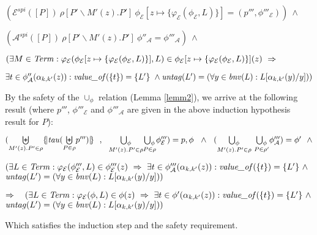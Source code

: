 \documentclass[10pt,a4paper,final,oneside,fleqn]{book}
\begin{document}
\noindent
$(\mathcal{E}^{spi}(\![P]\!)~\rho[P'\backslash M'(z).P']~\phi_\mathcal{E}[z\mapsto\{\varphi_\mathcal{E}(\phi_\mathcal{E},L)\}]=(p''',\phi'''_\mathcal{E}))~\wedge$

\noindent
$(\mathcal{A}^{spi}(\![P]\!)~\rho[P'\backslash M'(z).P']~\phi''_\mathcal{A}=\phi'''_\mathcal{A})~\wedge$

\noindent
$(\exists M\in\mbox{{\itshape Term\/}}:\varphi_\mathcal{E}(\phi_\mathcal{E}[z\mapsto\{\varphi_\mathcal{E}(\phi_\mathcal{E},L)\}],L)\in\phi_\mathcal{E}[z\mapsto\{\varphi_\mathcal{E}(\phi_\mathcal{E},L)\}](z)~\Rightarrow$

\noindent
$\exists t\in\phi''_\mathcal{A}(\alpha_{k,k'}(z)):\mbox{{\itshape value\_of\/}}(\{t\})=\{L'\}~\wedge\mbox{{\itshape untag\/}}(L')=(\forall y\in\mbox{{\itshape bnv\/}}(L):L[\alpha_{k,k'}(y)/y]))$\vspace{4mm}

\noindent
By the safety of the $\cup_\phi$ relation (Lemma \ref{lemm2}), we arrive at the following result (where $p'''$, $\phi'''_\mathcal{E}$ and $\phi'''_\mathcal{A}$ are given in the above induction hypothesis result for $P$):

\noindent
$(\underset{M'(z).P'\in\rho}{\biguplus}\{\!|\mbox{{\itshape tau\/}}(\underset{P\in\rho}{\biguplus}p''')|\!\}~~,~~\underset{M'(z).P'\in\rho}{\bigcup_\phi}\underset{P\in\rho}{\bigcup_\phi}\phi'''_\mathcal{E})=p,\phi~~\wedge~~(\underset{M'(z).P'\in\rho}{\bigcup_\phi}~\underset{P\in\rho'}{\bigcup_\phi}\phi'''_\mathcal{A})=\phi'~~\wedge$

\noindent
$(\exists L\in\mbox{{\itshape Term\/}}:\varphi_\mathcal{E}(\phi'''_\mathcal{E},L)\in\phi'''_\mathcal{E}(z)~\Rightarrow~\exists t\in\phi'''_\mathcal{A}(\alpha_{k,k'}(z)):\mbox{{\itshape value\_of\/}}(\{t\})=\{L'\}~\wedge$\\
$\mbox{{\itshape untag\/}}(L')=(\forall y\in\mbox{{\itshape bnv\/}}(L):L[\alpha_{k,k'}(y)/y]))$\vspace{4mm}

\noindent
$\Rightarrow~~~(\exists L\in\mbox{{\itshape Term\/}}:\varphi_\mathcal{E}(\phi,L)\in\phi(z)~\Rightarrow~\exists t\in\phi'(\alpha_{k,k'}(z)): \mbox{{\itshape value\_of\/}}(\{t\})=\{L'\}~\wedge$\\
$\mbox{{\itshape untag\/}}(L')=(\forall y\in\mbox{{\itshape bnv\/}}(L):L[\alpha_{k,k'}(y)/y]))$\vspace{4mm}

\noindent
Which satisfies the induction step and the safety requirement.\vspace{4mm}
\end{document}
